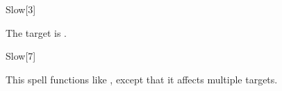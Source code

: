 \begin{spellsection}{Slow}[3]
    \begin{spellheader}
    \end{spellheader}
    \begin{spellcontent}
        \begin{spelltargetinginfo}
        \end{spelltargetinginfo}
        \begin{spelleffects}
            \spelleffect The target is \slowed.
            \spelldur \durbrief
        \end{spelleffects}
    \end{spellcontent}
    \begin{spellfooter}
        \miscastrandom
    \end{spellfooter}
\end{spellsection}

\begin{spellsection}[Mass]{Slow}[7]
    \begin{spellheader}
    \end{spellheader}
    \begin{spellcontent}
        \begin{spelltargetinginfo}
        \end{spelltargetinginfo}
        \begin{spelleffects}
            \spellspecial This spell functions like , except that it affects multiple targets.
        \end{spelleffects}
    \end{spellcontent}
    \begin{spellfooter}
        \miscastexplode
    \end{spellfooter}
\end{spellsection}

